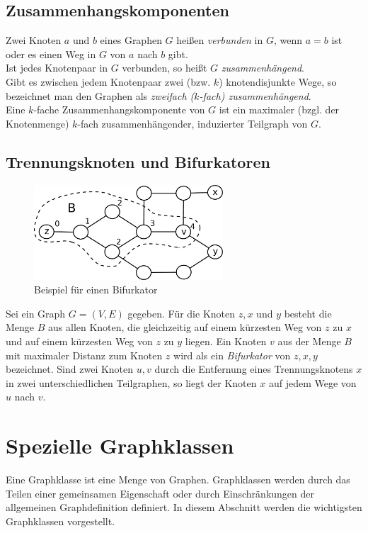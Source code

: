 \subsection{Zusammenhangskomponenten}
Zwei Knoten $a$ und $b$ eines Graphen $G$ heißen \emph{verbunden} in $G$, wenn $a = b$ ist oder es einen Weg in $G$ von $a$ nach $b$ gibt.\\Ist jedes Knotenpaar in $G$ verbunden, so heißt $G$ \emph{zusammenhängend}.\\Gibt es zwischen jedem Knotenpaar zwei (bzw. $k$) knotendisjunkte Wege, so bezeichnet man den Graphen als \emph{zweifach ($k$-fach) zusammenhängend}.\\Eine $k$-fache Zusammenhangskomponente von $G$ ist ein maximaler (bzgl. der Knotenmenge) $k$-fach zusammenhängender, induzierter Teilgraph von $G$.
\subsection{Trennungsknoten und Bifurkatoren}
\begin{figure}[ht]
\centering
\includegraphics*[width = 200pt]{bilder/bifurkator.pdf}
\caption{Beispiel für einen Bifurkator}
\label{bild:bifurkator}
\end{figure}  	 
Sei ein Graph $G=(V,E)$ gegeben. Für die Knoten $z,x$ und $y$ besteht die Menge $B$ aus allen Knoten, die gleichzeitig auf einem kürzesten Weg von $z$ zu $x$ und auf einem kürzesten Weg von $z$ zu $y$ liegen. Ein Knoten $v$ aus der Menge $B$ mit maximaler Distanz zum Knoten $z$ wird als ein \emph{Bifurkator} von $z, x, y$ bezeichnet.\newline
Sind zwei Knoten $u,v$ durch die Entfernung eines Trennungsknotens $x$ in zwei unterschiedlichen Teilgraphen, so liegt der Knoten $x$ auf jedem Wege von $u$ nach $v$.
\newpage
\section{Spezielle Graphklassen}
Eine Graphklasse ist eine Menge von Graphen. Graphklassen werden durch das Teilen einer gemeinsamen Eigenschaft oder durch Einschränkungen der allgemeinen Graphdefinition definiert. In diesem Abschnitt werden die wichtigsten Graphklassen vorgestellt.

